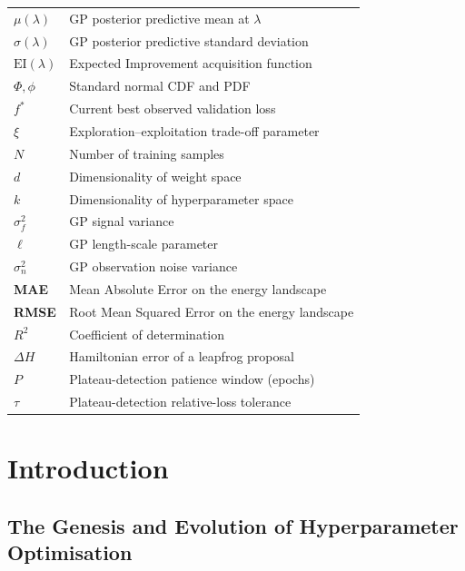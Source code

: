 \documentclass[11pt]{article}
\begin{document}
\begin{table}[H]
\begin{tabular}{>{\bfseries}p{1.45cm} p{6.0cm}}
$\mu(\lambda)$   & GP posterior predictive mean at $\lambda$ \\
$\sigma(\lambda)$& GP posterior predictive standard deviation \\
$\mathrm{EI}(\lambda)$ & Expected Improvement acquisition function \\
$\Phi,\phi$      & Standard normal CDF and PDF \\
$f^*$            & Current best observed validation loss \\
$\xi$            & Exploration–exploitation trade-off parameter \\
$N$              & Number of training samples \\
$d$              & Dimensionality of weight space \\
$k$              & Dimensionality of hyperparameter space \\
$\sigma_f^2$     & GP signal variance \\
$\ell$           & GP length-scale parameter \\
$\sigma_n^2$     & GP observation noise variance \\
MAE              & Mean Absolute Error on the energy landscape \\
RMSE             & Root Mean Squared Error on the energy landscape \\
$R^2$            & Coefficient of determination \\
$\Delta H$       & Hamiltonian error of a leapfrog proposal \\
$P$              & Plateau-detection patience window (epochs) \\
$\tau$           & Plateau-detection relative-loss tolerance \\
\bottomrule
\end{tabular}
\end{table}

\newpage


\section{Introduction}

\subsection{The Genesis and Evolution of Hyperparameter Optimisation}
\end{document}
